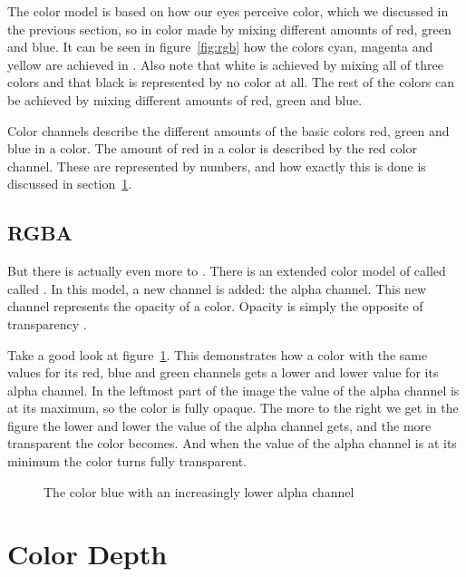 The \rgb color model is based on how our eyes perceive color, which we
discussed in the previous section, so in \rgb color made by mixing
different amounts of red, green and blue. It can be seen in figure~\ref{fig:rgb} how the colors cyan, magenta and yellow are achieved in
\rgb. Also note that white is achieved by mixing all of three colors
and that black is represented by no color at all. The rest of the
colors can be achieved by mixing different amounts of red, green and
blue.

Color channels describe the different amounts of the basic colors red,
green and blue in a color. The amount of red in a color is described
by the red color channel. These are represented by numbers, and how
exactly this is done is discussed in section~\ref{sec:color-depth}.

\subsection{RGBA}

But there is actually even more to \rgb. There is an extended color
model of \rgb called called \rgba. In this model, a new channel is
added: the alpha channel. This new channel represents the opacity of a
color. Opacity is simply the opposite of transparency
\cite{porter84_compos_dig_img,murray1996encyclopedia,niederst1999webdesign}.

Take a good look at figure~\ref{fig:alpha}. This demonstrates how a
color with the same values for its red, blue and green channels gets a
lower and lower value for its alpha channel. In the leftmost part of
the image the value of the alpha channel is at its maximum, so the
color is fully opaque. The more to the right we get in the figure the
lower and lower the value of the alpha channel gets, and the more
transparent the color becomes. And when the value of the alpha channel
is at its minimum the color turns fully transparent.

\begin{figure}
  \centering
  \caption{The color blue with an increasingly lower alpha channel}
  \label{fig:alpha}
\end{figure}

\newcommand{\rgbtrip}[3]{\mbox{(#1,#2,#3)}}

\section{Color Depth}
\label{sec:color-depth}

